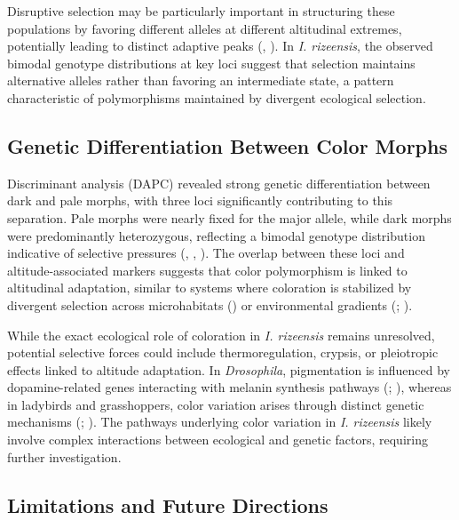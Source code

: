 \documentclass[9pt,a4paper,twoside]{rho-class/rho}
\begin{document}
Disruptive selection may be particularly important in structuring these populations by favoring different alleles at different altitudinal extremes, potentially leading to distinct adaptive peaks (\cite{Berdahl2015}, \cite{Forester2016}). In \textit{I. rizeensis}, the observed bimodal genotype distributions at key loci suggest that selection maintains alternative alleles rather than favoring an intermediate state, a pattern characteristic of polymorphisms maintained by divergent ecological selection.

\subsection{Genetic Differentiation Between Color Morphs}

Discriminant analysis (DAPC) revealed strong genetic differentiation between dark and pale morphs, with three loci significantly contributing to this separation. Pale morphs were nearly fixed for the major allele, while dark morphs were predominantly heterozygous, reflecting a bimodal genotype distribution indicative of selective pressures (\cite{Prince2017}, \cite{Thompson2019}, \cite{PereiraMartins2022}). The overlap between these loci and altitude-associated markers suggests that color polymorphism is linked to altitudinal adaptation, similar to systems where coloration is stabilized by divergent selection across microhabitats (\cite{Villoutreix2023}) or environmental gradients (\cite{Mullen2008}; \cite{Wittkopp2003}).

While the exact ecological role of coloration in \textit{I. rizeensis} remains unresolved, potential selective forces could include thermoregulation, crypsis, or pleiotropic effects linked to altitude adaptation. In \textit{Drosophila}, pigmentation is influenced by dopamine-related genes interacting with melanin synthesis pathways (\cite{Wright1987}; \cite{Wittkopp2003}), whereas in ladybirds and grasshoppers, color variation arises through distinct genetic mechanisms (\cite{MICHIE2010}; \cite{Bastide2016}). The pathways underlying color variation in \textit{I. rizeensis} likely involve complex interactions between ecological and genetic factors, requiring further investigation.

\subsection{Limitations and Future Directions}
\end{document}
